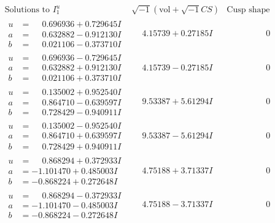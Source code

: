 \documentclass[1p]{elsarticle_modified}
\theoremstyle{definition}
\newcommand{\I}{\sqrt{-1}}
\begin{document}
$$\begin{array}{c|c|c}  
\text{Solutions to }I^u_{1}& \I (\text{vol} + \sqrt{-1}CS) & \text{Cusp shape}\\
 \hline 
\begin{aligned}
u &= \phantom{-}0.696936 + 0.729645 I \\
a &= \phantom{-}0.632882 - 0.912130 I \\
b &= \phantom{-}0.021106 - 0.373710 I\end{aligned}
 & \phantom{-}4.15739 + 0.27185 I & \phantom{-0.000000 } 0 \\ \hline\begin{aligned}
u &= \phantom{-}0.696936 - 0.729645 I \\
a &= \phantom{-}0.632882 + 0.912130 I \\
b &= \phantom{-}0.021106 + 0.373710 I\end{aligned}
 & \phantom{-}4.15739 - 0.27185 I & \phantom{-0.000000 } 0 \\ \hline\begin{aligned}
u &= \phantom{-}0.135002 + 0.952540 I \\
a &= \phantom{-}0.864710 - 0.639597 I \\
b &= \phantom{-}0.728429 - 0.940911 I\end{aligned}
 & \phantom{-}9.53387 + 5.61294 I & \phantom{-0.000000 } 0 \\ \hline\begin{aligned}
u &= \phantom{-}0.135002 - 0.952540 I \\
a &= \phantom{-}0.864710 + 0.639597 I \\
b &= \phantom{-}0.728429 + 0.940911 I\end{aligned}
 & \phantom{-}9.53387 - 5.61294 I & \phantom{-0.000000 } 0 \\ \hline\begin{aligned}
u &= \phantom{-}0.868294 + 0.372933 I \\
a &= -1.101470 + 0.485003 I \\
b &= -0.868224 + 0.272648 I\end{aligned}
 & \phantom{-}4.75188 + 3.71337 I & \phantom{-0.000000 } 0 \\ \hline\begin{aligned}
u &= \phantom{-}0.868294 - 0.372933 I \\
a &= -1.101470 - 0.485003 I \\
b &= -0.868224 - 0.272648 I\end{aligned}
 & \phantom{-}4.75188 - 3.71337 I & \phantom{-0.000000 } 0 \\ \hline\begin{aligned}

\end{aligned}
\end{array}$$
\end{document}
